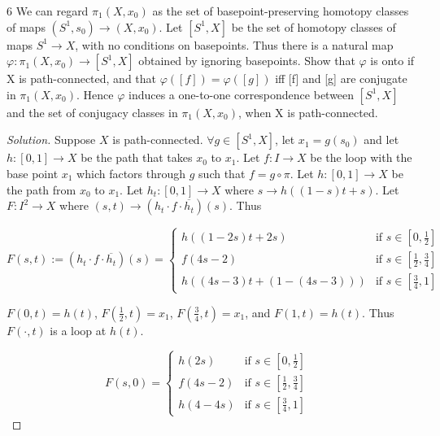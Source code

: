 \documentclass{article}
\newenvironment{solution}
{\renewcommand\qedsymbol{$\blacksquare$}\begin{proof}[Solution]}
{\end{proof}}
\begin{document}
\bigskip

\begin{PROB}{6}\label{Problem 6.}
    We can regard $\pi_1(X,x_0)$ as the set of basepoint-preserving homotopy classes of maps $(S^1,s_0) \to (X,x_0)$. Let $[S^1,X]$ be the set of homotopy classes of maps $S^1 \to X$,
    with no conditions on basepoints. Thus there is a natural map $\varphi : \pi_1(X,x_0) \to [S^1,X]$ obtained by ignoring basepoints. Show that $\varphi$ is onto if X is path-connected, and that $\varphi([f])=\varphi([g])$ iﬀ [f] and [g] are conjugate in $\pi_1(X,x_0)$. Hence $\varphi$  induces a one-to-one correspondence between $[S^1,X]$ and the set of conjugacy classes in $\pi_1(X, x_0)$, when X is path-connected.
\end{PROB}
\begin{solution} 
    Suppose $X$ is path-connected. $\forall g \in [S^1, X]$, let $x_1 = g(s_0)$ and let $h: [0, 1] \to X$ be the path that takes $x_0$ to $x_1$. Let $f: I \to X$ be the loop with the base point $x_1$  which factors through $g$ such that $f = g \circ \pi$. Let $h: [0, 1] \to X$ be the path from $x_0$ to $x_1$. Let $h_t : [0, 1] \to X$ where $s \to h((1 - s)t + s)$. Let $F: I^2 \to X$ where $(s, t) \to (h_t \cdot f \cdot \overline{h_t})(s)$. Thus 
    
    \begin{equation*}
        F(s, t) := (h_t \cdot f \cdot \overline{h_t})(s) = \begin{cases*}
            h((1 - 2s) t + 2s) & \text{if $s \in [0, \frac{1}{2}]$ } \\
            f(4s - 2) & \text{if $s \in [\frac{1}{2},\frac{3}{4}]$ } \\
            h((4s - 3) t + (1 - (4s - 3))) & \text{if $s \in [\frac{3}{4}, 1]$ }
        \end{cases*}
    \end{equation*}

    $F(0, t) = h(t)$, $F(\frac{1}{2}, t) = x_1$, $F(\frac{3}{4}, t) = x_1$, and $F(1, t) = h(t)$. Thus $F(\cdot, t)$ is a loop at $h(t)$. 
    
    \begin{equation*}
        F(s, 0) = \begin{cases*}
            h(2s) & \text{if $s \in [0, \frac{1}{2}]$ } \\
            f(4s - 2) & \text{if $s \in [\frac{1}{2},\frac{3}{4}]$ } \\
            h(4 - 4s) & \text{if $s \in [\frac{3}{4}, 1]$ }
        \end{cases*}
    \end{equation*}


\end{solution}
\end{document}
